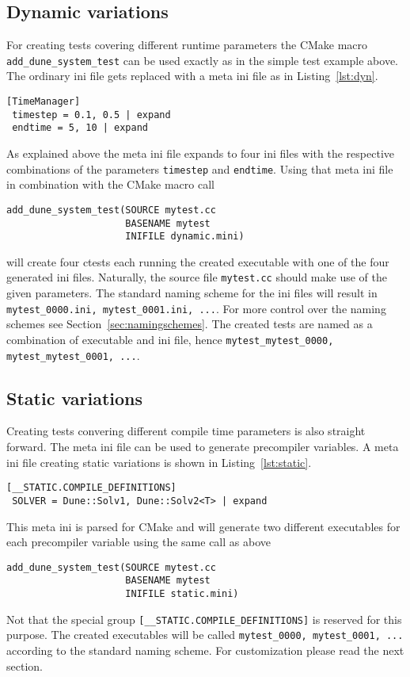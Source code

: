 \documentclass[11pt]{article}
\begin{document}
\subsection{Dynamic variations}
For creating tests covering different runtime parameters the CMake macro \lstinline!add_dune_system_test! can be used exactly
as in the simple test example above. The ordinary ini file gets replaced with a meta ini file as in Listing~\ref{lst:dyn}.
\begin{lstlisting}[caption={[dynamic.mini] An example of dynamic variations},label=lst:dyn]
 [TimeManager]
 timestep = 0.1, 0.5 | expand
 endtime = 5, 10 | expand
\end{lstlisting}
As explained above the meta ini file expands to four ini files with the respective combinations of the parameters \lstinline!timestep! and
\lstinline!endtime!. Using that meta ini file in combination with the CMake macro call
\begin{lstlisting}[caption={A CMakeLists.txt generating dynamic variations}]
add_dune_system_test(SOURCE mytest.cc
                     BASENAME mytest
                     INIFILE dynamic.mini)
\end{lstlisting}
will create four ctests each running the created executable with one of the four generated ini files. Naturally, the source file \lstinline!mytest.cc!
should make use of the given parameters. The standard naming scheme for the ini files will result in \lstinline!mytest_0000.ini, mytest_0001.ini, ...!.
For more control over the naming schemes see Section~\ref{sec:namingschemes}. The created tests are named as a combination of executable and ini file,
hence \lstinline!mytest_mytest_0000, mytest_mytest_0001, ...!.

\subsection{Static variations}
Creating tests convering different compile time parameters is also straight forward. The meta ini file can be used to generate precompiler
variables. A meta ini file creating static variations is shown in Listing~\ref{lst:static}.
\begin{lstlisting}[caption={[static.mini] An example of dynamic variations},label=lst:dyn]
 [__STATIC.COMPILE_DEFINITIONS]
 SOLVER = Dune::Solv1, Dune::Solv2<T> | expand
\end{lstlisting}
This meta ini is parsed for CMake and will generate two different executables for each precompiler variable using the same call as above
\begin{lstlisting}[caption={A CMakeLists.txt generating static variations with compile definitions}]
add_dune_system_test(SOURCE mytest.cc
                     BASENAME mytest
                     INIFILE static.mini)
\end{lstlisting}
Not that the special group \lstinline![__STATIC.COMPILE_DEFINITIONS]! is reserved for this purpose. The created executables will be called \lstinline!mytest_0000, mytest_0001, ...! according to the standard naming scheme. For customization
please read the next section.
\end{document}
